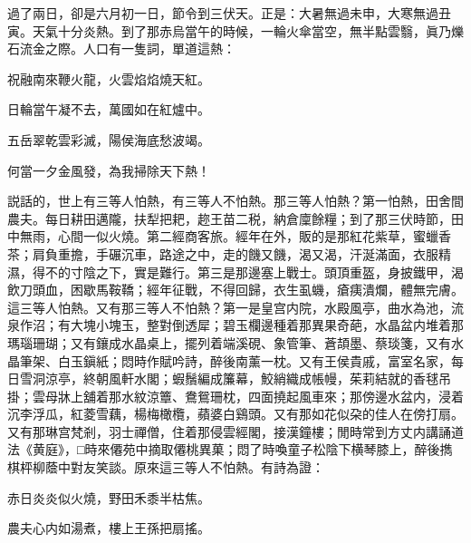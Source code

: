 過了兩日，卻是六月初一日，節令到三伏天。正是：大暑無過未申，大寒無過丑寅。天氣十分炎熱。到了那赤烏當午的時候，一輪火傘當空，無半點雲翳，眞乃爍石流金之際。人口有一隻詞，單道這熱：

\begin{myquote}
祝融南來鞭火龍，火雲焰焰燒天紅。

日輪當午凝不去，萬國如在紅爐中。

五岳翠乾雲彩滅，陽侯海底愁波竭。

何當一夕金風發，為我掃除天下熱！
\end{myquote}

説話的，世上有三等人怕熱，有三等人不怕熱。那三等人怕熱？第一怕熱，田舍間農夫。每日耕田邁隴，扶犁把耙，趂王苗二税，納倉廩餘糧；到了那三伏時節，田中無雨，心間一似火燒。第二經商客旅。經年在外，販的是那紅花紫草，蜜蠟香茶；肩負重擔，手碾沉車，路途之中，走的饑又饑，渴又渴，汗涎滿面，衣服精濕，得不的寸陰之下，實是難行。第三是那邊塞上戰士。頭頂重盔，身披鐵甲，渴飲刀頭血，困歇馬鞍鞽；經年征戰，不得回歸，衣生虱蟣，瘡痍潰爛，體無完膚。這三等人怕熱。又有那三等人不怕熱？第一是皇宫内院，水殿風亭，曲水為池，流泉作沼；有大塊小塊玉，整對倒透犀；碧玉欄邊種着那異果奇葩，水晶盆内堆着那瑪瑙珊瑚；又有鑲成水晶桌上，擺列着端溪硯、象管筆、蒼頡墨、蔡琰箋，又有水晶筆架、白玉鎭紙；悶時作賦吟詩，醉後南薰一枕。又有王侯貴戚，富室名家，每日雪洞涼亭，終朝風軒水閣；蝦鬚編成簾幕，鮫綃織成帳幔，茱莉結就的香毬吊掛；雲母牀上舖着那水紋涼簟、鴦鴛珊枕，四面撓起風車來；那傍邊水盆内，浸着沉李浮瓜，紅菱雪藕，楊梅橄欖，蘋婆白鷄頭。又有那如花似朶的佳人在傍打扇。又有那琳宫梵剎，羽士禪僧，住着那侵雲經閣，接漢鐘樓；閒時常到方丈内講誦道法《黄庭》，□時來僊苑中摘取僊桃異菓；悶了時喚童子松陰下横琴膝上，醉後擕棋枰柳蔭中對友笑談。原來這三等人不怕熱。有詩為證：

\begin{myquote}
赤日炎炎似火燒，野田禾黍半枯焦。

農夫心内如湯煮，樓上王孫把扇搖。
\end{myquote}


